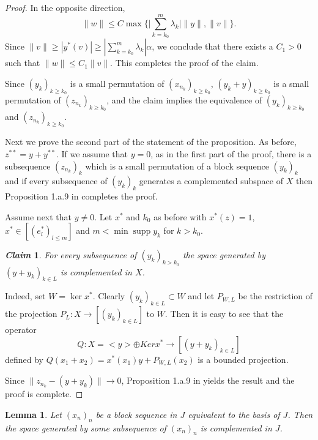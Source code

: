 \documentclass[12pt]{amsart}
\theoremstyle{plain}
\numberwithin{equation}{section}
\DeclareMathOperator{\supp}{supp}
\newtheorem{lemma}[theorem]{Lemma}
\newtheorem*{claim}{\textit{Claim}}
\begin{document}
\begin{proof}
In the opposite direction,
\[\|w\| \leq C \max \Big\{\Big|\sum_{k=k_0}^m \lambda_k\Big| \|y\|, \|v\| \Big\}. \]
Since $\|v\| \geq |y^*(v)| \geq |\sum_{k=k_0}^m \lambda_k| \alpha$, we conclude that there exists a $C_1 > 0$ such that $\|w\| \leq C_1 \|v\|$.
This completes the proof of the claim.

Since $(y_k)_{k\geq k_0}$ is a small permutation of $(x_{n_k})_{k\geq k_0}$, $(y_k + y)_{k\geq k_0}$ is a small permutation of $(z_{n_k})_{k\geq k_0}$, and the claim implies the equivalence of $(y_k)_{k\geq k_0}$ and $(z_{n_k})_{k\geq k_0}$.

Next we prove the second part of the statement of the proposition. As before, $z^{**} = y+ y^{**}$. If we assume that $y = 0$, as in the first part of the proof, there is a subsequence $(z_{n_k})_k$ which is a small permutation of a block sequence $(y_k)_k$ and if every subsequence of $(y_k)_k$  generates a complemented subspace of $X$ then Proposition 1.a.9 in \cite{L-T:77} completes the proof.

Assume next that $y\ne 0$. Let $x^*$ and $ k_0 $ as before with $x^*(z) = 1$, $x^*\in [ (e_l^*)_{l\le {m}}]$ and $m< \min\supp y_k$ for $k>k_0$.

\begin{claim} For every subsequence of $(y_k) _{k>k_{0}}$ the space generated by $ (y+y_k)_{k\in L}$
 is complemented in $X$.
\end{claim}

Indeed, set $W = \ker x^*$. Clearly $(y_k)_{k\in L} \subset W$ and let  $P_{W,L} $ be the restriction of the projection $P_L:  X\to [(y_k)_{k\in L}]$  to $W$. Then it is easy to see that the operator
\[ Q: X=<y> \oplus Kerx^* \to [(y+y_k)_{k\in L}] \] defined by $Q(x_1 +x_2 ) = x^*(x_1 )y+P_{W,L}(x_2)$ is a bounded projection.

Since $\| z_{n_k} -( y+y_k)\| \to 0$, Proposition 1.a.9 in \cite{L-T:77} yields the result and the proof is complete.
\end{proof}
\begin{lemma}\label{compl.J} Let $(x_n)_n$ be a block sequence in $J$ equivalent to the basis of $J$. Then the space generated by some subsequence of $(x_n)_n$ is complemented in $J$.
\end{lemma}
\end{document}
